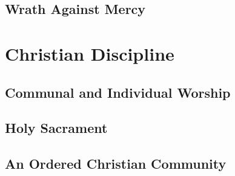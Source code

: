 \documentclass[10pt]{article}
\begin{document}
\subsection*{Wrath Against Mercy}



\section*{Christian Discipline}

\subsection*{Communal and Individual Worship}

\subsection*{Holy Sacrament}

\subsection*{An Ordered Christian Community}
\end{document}
